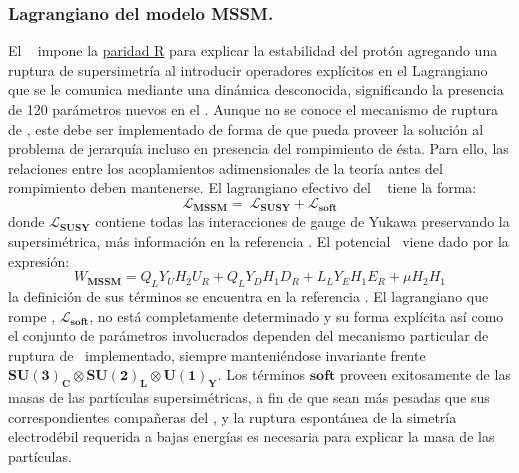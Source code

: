 \subsubsection{Lagrangiano del modelo MSSM.}
El \MSSM ~ impone la \href{https://es.wikipedia.org/wiki/Paridad\_R}{paridad R} para explicar la estabilidad del protón agregando una ruptura de supersimetría al introducir operadores explícitos en el Lagrangiano que se le comunica mediante una dinámica desconocida, significando la presencia de 120 parámetros nuevos en el \MSSM.
Aunque no se conoce el mecanismo de ruptura de \SUSY, este debe ser implementado de forma de que pueda proveer la solución al problema de jerarquía incluso en presencia del rompimiento de ésta. Para ello, las relaciones entre los acoplamientos adimensionales de la teoría antes del rompimiento deben mantenerse. El lagrangiano efectivo del \MSSM ~ tiene la forma:
\begin{equation}\label{lagrangianoMSSM}
\mathcal{L}_\mathbf{MSSM} = ~ \mathcal{L}_\mathbf{SUSY}+\mathcal{L}_\mathbf{soft}
\end{equation}
donde $\mathcal{L}_\mathbf{SUSY}$ contiene todas las interacciones de gauge de Yukawa preservando la supersimétrica, más información en la referencia \cite{kuroda_complete_2005}. El potencial \MSSM ~viene dado por la expresión:
\begin{equation}\label{potencialMSSM}
W_\mathbf{MSSM} = Q_L Y_U H_2 U_R + Q_L Y_D H_1 D_R + L_L Y_E H_1 E_R + \mu H_2 H_1 
\end{equation}
la definición de sus términos se encuentra en la referencia \cite{kuroda_complete_2005}.
El lagrangiano que rompe \SUSY, $\mathcal{L}_\mathbf{soft}$, no está completamente determinado y su forma explícita así como el conjunto de parámetros involucrados dependen del mecanismo particular de ruptura de \SUSY ~implementado, siempre manteniéndose invariante frente $\mathbf{SU(3)_C} \otimes \mathbf{SU(2)_L} \otimes \mathbf{U(1)_Y}$. Los términos $\mathbf{soft}$ proveen exitosamente de las masas de las partículas supersimétricas, a fin de que sean más pesadas que sus correspondientes compañeras del \ME, y la ruptura espontánea de la simetría electrodébil requerida a bajas energías es necesaria para explicar la masa de las partículas.


